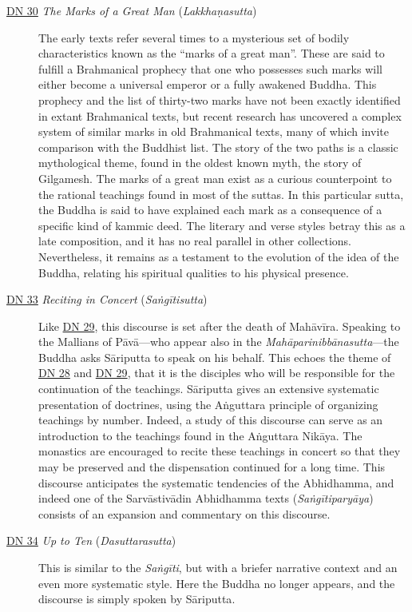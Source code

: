 \documentclass[12pt,openany]{book}%
\begin{document}
\begin{description}
\item[\href{https://suttacentral.net/dn30}{DN 30} \textit{The Marks of a Great Man} (\textit{\textsanskrit{Lakkhaṇasutta}})] The early texts refer several times to a mysterious set of bodily characteristics known as the “marks of a great man”. These are said to fulfill a Brahmanical prophecy that one who possesses such marks will either become a universal emperor or a fully awakened Buddha. This prophecy and the list of thirty-two marks have not been exactly identified in extant Brahmanical texts, but recent research has uncovered a complex system of similar marks in old Brahmanical texts, many of which invite comparison with the Buddhist list. The story of the two paths is a classic mythological theme, found in the oldest known myth, the story of Gilgamesh. The marks of a great man exist as a curious counterpoint to the rational teachings found in most of the suttas. In this particular sutta, the Buddha is said to have explained each mark as a consequence of a specific kind of kammic deed. The literary and verse styles betray this as a late composition, and it has no real parallel in other collections. Nevertheless, it remains as a testament to the evolution of the idea of the Buddha, relating his spiritual qualities to his physical presence.%
\item[\href{https://suttacentral.net/dn33}{DN 33} \textit{Reciting in Concert} (\textit{\textsanskrit{Saṅgītisutta}})] Like \href{https://suttacentral.net/dn29}{DN 29}, this discourse is set after the death of \textsanskrit{Mahāvīra}. Speaking to the Mallians of \textsanskrit{Pāvā}—who appear also in the \textit{\textsanskrit{Mahāparinibbānasutta}}—the Buddha asks \textsanskrit{Sāriputta} to speak on his behalf. This echoes the theme of \href{https://suttacentral.net/dn28}{DN 28} and \href{https://suttacentral.net/dn29}{DN 29}, that it is the disciples who will be responsible for the continuation of the teachings. \textsanskrit{Sāriputta} gives an extensive systematic presentation of doctrines, using the \textsanskrit{Aṅguttara} principle of organizing teachings by number. Indeed, a study of this discourse can serve as an introduction to the teachings found in the \textsanskrit{Aṅguttara} \textsanskrit{Nikāya}. The monastics are encouraged to recite these teachings in concert so that they may be preserved and the dispensation continued for a long time. This discourse anticipates the systematic tendencies of the Abhidhamma, and indeed one of the \textsanskrit{Sarvāstivādin} Abhidhamma texts (\textit{\textsanskrit{Saṅgītiparyāya}}) consists of an expansion and commentary on this discourse.%
\item[\href{https://suttacentral.net/dn34}{DN 34} \textit{Up to Ten} (\textit{Dasuttarasutta})] This is similar to the \textit{\textsanskrit{Saṅgīti}}, but with a briefer narrative context and an even more systematic style. Here the Buddha no longer appears, and the discourse is simply spoken by \textsanskrit{Sāriputta}.%
\end{description}
\end{document}
